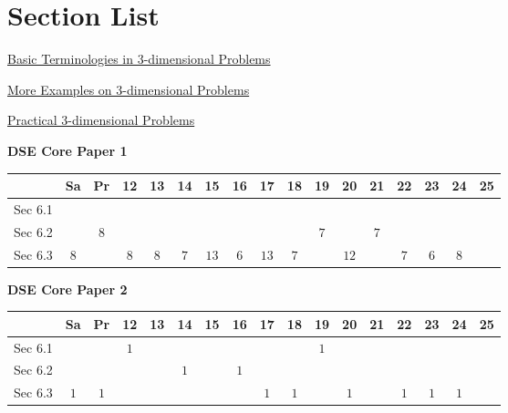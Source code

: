 \documentclass[12pt, a4paper]{article}
\begin{document}
\section*{Section List}
\begin{enumx}[label=Sec 6.\arabic*\ ]
\item \hyperref[section:5-6-1]{Basic Terminologies in 3-dimensional Problems \NF}
\item \hyperref[section:5-6-2]{More Examples on 3-dimensional Problems \NF}
\item \hyperref[section:5-6-3]{Practical 3-dimensional Problems \NF}
\end{enumx}
\begin{absolutelynopagebreak}
\begin{center}
\textbf{DSE Core Paper 1}
\end{center}
\begin{center}
\begin{tabular}{|l|c|c|c|c|c|c|c|c|c|c|c|c|c|c|c|c|}
\hline
        & Sa & Pr & 12 & 13 & 14 & 15 & 16 & 17 & 18 & 19 & 20 & 21 & 22 & 23 & 24 & 25 \\\hline\hline
Sec 6.1 &  &  &  &  &  &  &  &  &  &  &  &  &  &  &  &  \\\hline
Sec 6.2 &  &  $8$ &  &  &  &  &  &  &  &  $7$ &  &  $7$ &  &  &  &  \\\hline
Sec 6.3 &  $8$ &  &  $8$ &  $8$ &  $7$ &  $13$ &  $6$ &  $13$ &  $7$ &  &  $12$ &  &  $7$ &  $6$ &  $8$ &  \\\hline
\end{tabular}
\end{center}
\end{absolutelynopagebreak}
\begin{absolutelynopagebreak}
\begin{center}
\textbf{DSE Core Paper 2}
\end{center}
\begin{center}
\begin{tabular}{|l|c|c|c|c|c|c|c|c|c|c|c|c|c|c|c|c|}
\hline
        & Sa & Pr & 12 & 13 & 14 & 15 & 16 & 17 & 18 & 19 & 20 & 21 & 22 & 23 & 24 & 25 \\\hline\hline
Sec 6.1 &  &  &  $1$ &  &  &  &  &  &  &  $1$ &  &  &  &  &  &  \\\hline
Sec 6.2 &  &  &  &  &  $1$ &  &  $1$ &  &  &  &  &  &  &  &  &  \\\hline
Sec 6.3 &  $1$ &  $1$ &  &  &  &  &  &  $1$ &  $1$ &  &  $1$ &  &  $1$ &  $1$ &  $1$ &  \\\hline
\end{tabular}
\end{center}
\end{absolutelynopagebreak}
\end{document}

